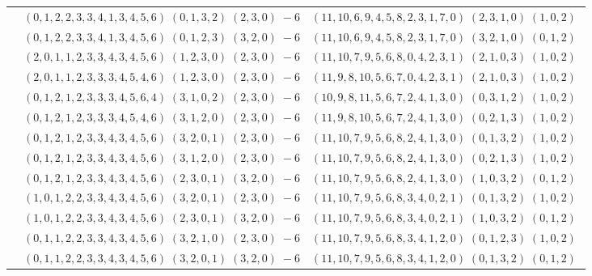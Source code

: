 \documentclass[11pt]{article}
\begin{document}
\begin{longtable}[l]{|c|c|c|}
 \cline{2-3} 
 & $(0 ,1 ,2 ,2 ,3 ,3 ,4 ,1 ,3 ,4 ,5 ,6) \;(0 ,1 ,3 ,2) \;(2 ,3 ,0) \;-6$ & $(11 ,10 ,6 ,9 ,4 ,5 ,8 ,2 ,3 ,1 ,7 ,0) \;(2 ,3 ,1 ,0) \;(1 ,0 ,2) \;$\\ 
 \cline{2-3} 
 & $(0 ,1 ,2 ,2 ,3 ,3 ,4 ,1 ,3 ,4 ,5 ,6) \;(0 ,1 ,2 ,3) \;(3 ,2 ,0) \;-6$ & $(11 ,10 ,6 ,9 ,4 ,5 ,8 ,2 ,3 ,1 ,7 ,0) \;(3 ,2 ,1 ,0) \;(0 ,1 ,2) \;$\\ 
 \cline{2-3} 
 & $(2 ,0 ,1 ,1 ,2 ,3 ,3 ,4 ,3 ,4 ,5 ,6) \;(1 ,2 ,3 ,0) \;(2 ,3 ,0) \;-6$ & $(11 ,10 ,7 ,9 ,5 ,6 ,8 ,0 ,4 ,2 ,3 ,1) \;(2 ,1 ,0 ,3) \;(1 ,0 ,2) \;$\\ 
 \cline{2-3} 
 & $(2 ,0 ,1 ,1 ,2 ,3 ,3 ,3 ,4 ,5 ,4 ,6) \;(1 ,2 ,3 ,0) \;(2 ,3 ,0) \;-6$ & $(11 ,9 ,8 ,10 ,5 ,6 ,7 ,0 ,4 ,2 ,3 ,1) \;(2 ,1 ,0 ,3) \;(1 ,0 ,2) \;$\\ 
 \cline{2-3} 
 & $(0 ,1 ,2 ,1 ,2 ,3 ,3 ,3 ,4 ,5 ,6 ,4) \;(3 ,1 ,0 ,2) \;(2 ,3 ,0) \;-6$ & $(10 ,9 ,8 ,11 ,5 ,6 ,7 ,2 ,4 ,1 ,3 ,0) \;(0 ,3 ,1 ,2) \;(1 ,0 ,2) \;$\\ 
 \cline{2-3} 
 & $(0 ,1 ,2 ,1 ,2 ,3 ,3 ,3 ,4 ,5 ,4 ,6) \;(3 ,1 ,2 ,0) \;(2 ,3 ,0) \;-6$ & $(11 ,9 ,8 ,10 ,5 ,6 ,7 ,2 ,4 ,1 ,3 ,0) \;(0 ,2 ,1 ,3) \;(1 ,0 ,2) \;$\\ 
 \cline{2-3} 
 & $(0 ,1 ,2 ,1 ,2 ,3 ,3 ,4 ,3 ,4 ,5 ,6) \;(3 ,2 ,0 ,1) \;(2 ,3 ,0) \;-6$ & $(11 ,10 ,7 ,9 ,5 ,6 ,8 ,2 ,4 ,1 ,3 ,0) \;(0 ,1 ,3 ,2) \;(1 ,0 ,2) \;$\\ 
 \cline{2-3} 
 & $(0 ,1 ,2 ,1 ,2 ,3 ,3 ,4 ,3 ,4 ,5 ,6) \;(3 ,1 ,2 ,0) \;(2 ,3 ,0) \;-6$ & $(11 ,10 ,7 ,9 ,5 ,6 ,8 ,2 ,4 ,1 ,3 ,0) \;(0 ,2 ,1 ,3) \;(1 ,0 ,2) \;$\\ 
 \cline{2-3} 
 & $(0 ,1 ,2 ,1 ,2 ,3 ,3 ,4 ,3 ,4 ,5 ,6) \;(2 ,3 ,0 ,1) \;(3 ,2 ,0) \;-6$ & $(11 ,10 ,7 ,9 ,5 ,6 ,8 ,2 ,4 ,1 ,3 ,0) \;(1 ,0 ,3 ,2) \;(0 ,1 ,2) \;$\\ 
 \cline{2-3} 
 & $(1 ,0 ,1 ,2 ,2 ,3 ,3 ,4 ,3 ,4 ,5 ,6) \;(3 ,2 ,0 ,1) \;(2 ,3 ,0) \;-6$ & $(11 ,10 ,7 ,9 ,5 ,6 ,8 ,3 ,4 ,0 ,2 ,1) \;(0 ,1 ,3 ,2) \;(1 ,0 ,2) \;$\\ 
 \cline{2-3} 
 & $(1 ,0 ,1 ,2 ,2 ,3 ,3 ,4 ,3 ,4 ,5 ,6) \;(2 ,3 ,0 ,1) \;(3 ,2 ,0) \;-6$ & $(11 ,10 ,7 ,9 ,5 ,6 ,8 ,3 ,4 ,0 ,2 ,1) \;(1 ,0 ,3 ,2) \;(0 ,1 ,2) \;$\\ 
 \cline{2-3} 
 & $(0 ,1 ,1 ,2 ,2 ,3 ,3 ,4 ,3 ,4 ,5 ,6) \;(3 ,2 ,1 ,0) \;(2 ,3 ,0) \;-6$ & $(11 ,10 ,7 ,9 ,5 ,6 ,8 ,3 ,4 ,1 ,2 ,0) \;(0 ,1 ,2 ,3) \;(1 ,0 ,2) \;$\\ 
 \cline{2-3} 
 & $(0 ,1 ,1 ,2 ,2 ,3 ,3 ,4 ,3 ,4 ,5 ,6) \;(3 ,2 ,0 ,1) \;(3 ,2 ,0) \;-6$ & $(11 ,10 ,7 ,9 ,5 ,6 ,8 ,3 ,4 ,1 ,2 ,0) \;(0 ,1 ,3 ,2) \;(0 ,1 ,2) \;$\\ 

\end{longtable}
\end{document}

